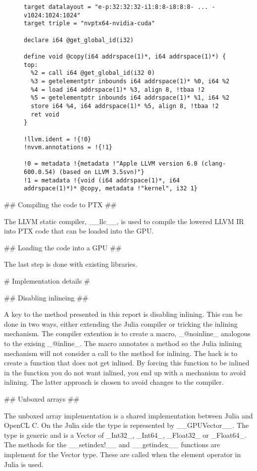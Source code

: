 \begin{markdown}
\begin{figure}[H]
  \begin{verbatim}
target datalayout = "e-p:32:32:32-i1:8:8-i8:8:8- ... -v1024:1024:1024"
target triple = "nvptx64-nvidia-cuda"

declare i64 @get_global_id(i32)

define void @copy(i64 addrspace(1)*, i64 addrspace(1)*) {
top:
  %2 = call i64 @get_global_id(i32 0)
  %3 = getelementptr inbounds i64 addrspace(1)* %0, i64 %2
  %4 = load i64 addrspace(1)* %3, align 8, !tbaa !2
  %5 = getelementptr inbounds i64 addrspace(1)* %1, i64 %2
  store i64 %4, i64 addrspace(1)* %5, align 8, !tbaa !2
  ret void
}

!llvm.ident = !{!0}
!nvvm.annotations = !{!1}

!0 = metadata !{metadata !"Apple LLVM version 6.0 (clang-600.0.54) (based on LLVM 3.5svn)"}
!1 = metadata !{void (i64 addrspace(1)*, i64 addrspace(1)*)* @copy, metadata !"kernel", i32 1}
  \end{verbatim}
  \caption{}
  \label{fig:julia-copy}
\end{figure}

## Compiling the code to PTX ##

The LLVM static compiler, __llc__, is used to compile the lowered LLVM
IR into PTX code that can be loaded into the GPU. 

## Loading the code into a GPU ##

The last step is done with existing libraries. 

# Implementation details #
\label{sec:implementation-details}

## Disabling inlineing ##

A key to the method presented in this report is disabling inlining.
This can be done in two ways, either extending the Julia compiler or
tricking the inlining mechanism. The compiler extention is to create a
macro, _@noinline_ analogous to the exising _@inline_. The macro
annotates a method so the Julia inlining mechanism will not consider a
call to the method for inlining. The hack is to create a function that
does not get inlined. By forcing this function to be inlined in the
function you do not want inlined, you end up with a mechanism to avoid
inlining. The latter approach is chosen to avoid changes to the
compiler. 

## Unboxed arrays ##
\label{sec:implementation-details-unboxed}

The unboxed array implementation is a shared implementation between
Julia and OpenCL C. On the Julia side the type is represented by
__GPUVector__. The type is generic and is a Vector of _Int32_,
_Int64_, _Float32_ or _Float64_. The methods for the __setindex!__ and
__getindex__ functions are implement for the Vector type. These are
called when the element operator in Julia is used.


\end{markdown}
